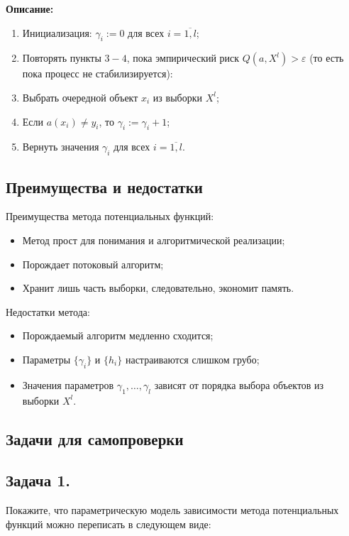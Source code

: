 \noindent \textbf{Описание:}

\begin{enumerate}
	\item  Инициализация: $\gamma_i:=0$ для всех $i=\overline{1,l}$; 
	\item Повторять пункты $3-4$, пока эмпирический риск $Q(a,X^l) > \varepsilon$ (то есть пока процесс не стабилизируется):  
	\item Выбрать очередной объект $x_i$ из выборки $X^l$;
	\item Если $a(x_i) \not= y_i$, то $\gamma_i:=\gamma_i+1$;
	\item Вернуть значения $\gamma_i$ для всех $i=\overline{1,l}$.
\end{enumerate}

\subsection{Преимущества и недостатки}

Преимущества метода потенциальных функций:

\begin{itemize}
	\item Метод прост для понимания и алгоритмической реализации;
	\item Порождает потоковый алгоритм; 
	\item Хранит лишь часть выборки, следовательно, экономит память.
\end{itemize}

\noindent Недостатки метода:

\begin{itemize}
	\item Порождаемый алгоритм медленно сходится;
	\item Параметры $\{\gamma_i\}$ и $\{h_i\}$ настраиваются слишком грубо; 
	\item Значения параметров $\gamma_1,\dots,\gamma_l$ зависят от порядка выбора объектов из выборки $X^l$.
\end{itemize}

\subsection{Задачи для самопроверки}

\subsection*{Задача 1.}
Покажите, что параметрическую модель зависимости метода потенциальных функций можно переписать в следующем виде:

